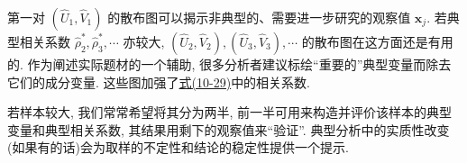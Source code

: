 第一对 $(\hat{U}_1,\hat{V}_1)$ 的散布图可以揭示非典型的、需要进一步研究的观察值 $\mathbf{x}_j$. 若典型相关系数 $\hat{\rho}_2^*,\hat{\rho}_3^*,\cdots$ 亦较大, $(\hat{U}_2,\hat{V}_2),(\hat{U}_3,\hat{V}_3),\cdots$ 的散布图在这方面还是有用的. 作为阐述实际题材的一个辅助, 很多分析者建议标绘“重要的”典型变量而除去它们的成分变量. 这些图加强了\hyperref[eq:10-29]{式(10-29)}中的相关系数.

若样本较大, 我们常常希望将其分为两半, 前一半可用来构造并评价该样本的典型变量和典型相关系数, 其结果用剩下的观察值来“验证”. 典型分析中的实质性改变(如果有的话)会为取样的不定性和结论的稳定性提供一个提示.
